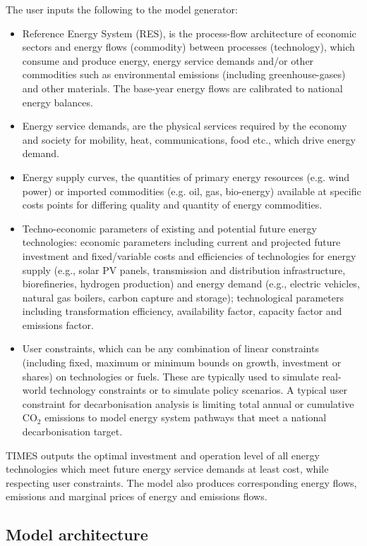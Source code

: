 \documentclass[gmd,manuscript]{copernicus}
\begin{document}
The user inputs the following to the model generator:
\begin{itemize}
 \item Reference Energy System (RES), is the process-flow architecture of economic sectors and energy flows (commodity) between processes (technology), which consume and produce energy, energy service demands and/or other commodities such as environmental emissions (including greenhouse-gases) and other materials. The base-year energy flows are calibrated to national energy balances.
 \item Energy service demands, are the physical services required by the economy and society for mobility, heat, communications, food etc., which drive energy demand. 
 \item Energy supply curves, the quantities of primary energy resources (e.g. wind power) or imported commodities (e.g. oil, gas, bio-energy) available at specific costs points for differing quality and quantity of energy commodities.
 \item Techno-economic parameters of existing and potential future energy technologies: economic parameters including current and projected future investment and fixed/variable costs and efficiencies of technologies for energy supply (e.g., solar PV panels, transmission and distribution infrastructure, biorefineries, hydrogen production) and energy demand (e.g., electric vehicles, natural gas boilers, carbon capture and storage); technological parameters including transformation efficiency, availability factor, capacity factor and emissions factor. 
 \item User constraints, which can be any combination of linear constraints (including fixed, maximum or minimum bounds on growth, investment or shares) on technologies or fuels. These are typically used to simulate real-world technology constraints or to simulate policy scenarios. A typical user constraint for decarbonisation analysis is limiting total annual or cumulative CO$_2$ emissions to model energy system pathways that meet a national decarbonisation target.
\end{itemize} 

TIMES outputs the optimal investment and operation level of all energy technologies which meet future energy service demands at least cost, while respecting user constraints. The model also produces corresponding energy flows, emissions and marginal prices of energy and emissions flows. 

\subsection{Model architecture}
\label{ss:system_overview}
\end{document}
